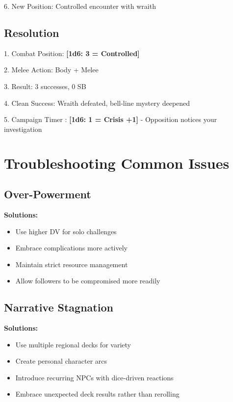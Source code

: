 \documentclass[11pt]{article}
\newcommand{\dice}[1]{\textbf{[1d6: #1]}}
\begin{document}
6. New Position: Controlled encounter with wraith

\subsection{Resolution}

1. Combat Position: \dice{3 = Controlled}

2. Melee Action: Body + Melee

3. Result: 3 successes, 0 SB

4. Clean Success: Wraith defeated, bell-line mystery deepened

5. Campaign Timer : \dice{1 = Crisis +1} - Opposition notices your investigation

\section{Troubleshooting Common Issues}

\subsection{Over-Powerment}

\begin{framed}
\textbf{Solutions:}
\begin{itemize}
    \item Use higher DV for solo challenges
    \item Embrace complications more actively
    \item Maintain strict resource management
    \item Allow followers to be compromised more readily
\end{itemize}
\end{framed}

\subsection{Narrative Stagnation}

\begin{framed}
\textbf{Solutions:}
\begin{itemize}
    \item Use multiple regional decks for variety
    \item Create personal character arcs
    \item Introduce recurring NPCs with dice-driven reactions
    \item Embrace unexpected deck results rather than rerolling
\end{itemize}
\end{framed}
\end{document}
